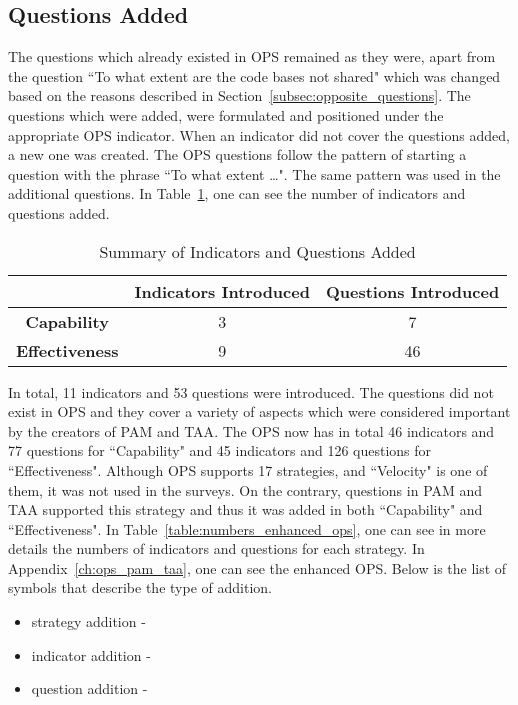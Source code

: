 \subsection{Questions Added}
The questions which already existed in \ac{OPS} remained as they were, apart from the question ``To what extent are the code bases not shared" which was changed based on the reasons described in Section~\ref{subsec:opposite_questions}. The questions which were added, were formulated and positioned under the appropriate \ac{OPS} indicator. When an indicator did not cover the questions added, a new one was created. The \ac{OPS} questions follow the pattern of starting a question with the phrase ``To what extent \dots ". The same pattern was used in the additional questions. In Table~\ref{table:summary_questions_added}, one can see the number of indicators and questions added. 

\begin{table} [H]
	\caption{Summary of Indicators and Questions Added}
	\label{table:summary_questions_added}
	\begin{tabular}{| c | c | c |} \hline
		 & \textbf{Indicators Introduced} & \textbf{Questions Introduced} \\ \hline
		 \textbf{Capability} & 3 & 7 \\ \hline
		 \textbf{Effectiveness} & 9 & 46 \\ \hline
	\end{tabular}
\end{table}

In total, 11 indicators and 53 questions were introduced. The questions did not exist in \ac{OPS} and they cover a variety of aspects which were considered important by the creators of \ac{PAM} and \ac{TAA}. The \ac{OPS} now has in total 46 indicators and 77 questions for ``Capability" and 45 indicators and 126 questions for ``Effectiveness". Although \ac{OPS} supports 17 strategies, and ``Velocity" is one of them, it was not used in the surveys. On the contrary, questions in \ac{PAM} and \ac{TAA} supported this strategy and thus it was added in both ``Capability" and ``Effectiveness". In Table~\ref{table:numbers_enhanced_ops}, one can see in more details the numbers of indicators and questions for each strategy. In Appendix~\ref{ch:ops_pam_taa}, one can see the enhanced \ac{OPS}. Below is the list of symbols that describe the type of addition.

\begin{itemize}
	\item strategy addition - \TwelweStar
	\item indicator addition - \FiveStarOutline
	\item question addition - \FiveStar
\end{itemize}

